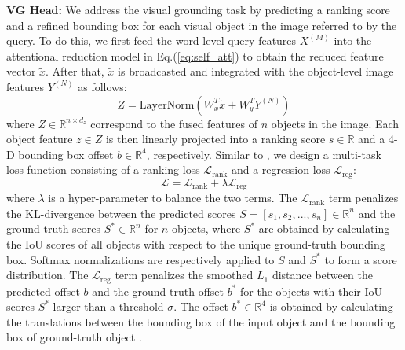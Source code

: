 \documentclass[sigconf]{acmart}
\begin{document}
\noindent\textbf{VG Head:} We address the visual grounding task by predicting a ranking score and a refined bounding box for each visual object in the image referred to by the query. To do this, we first feed the word-level query features $X^{(M)}$ into the attentional reduction model in Eq.(\ref{eq:self_att}) to obtain the reduced feature vector $\tilde{x}$. After that, $\tilde{x}$ is broadcasted and integrated with the object-level image features $Y^{(N)}$ as follows:
\begin{equation}\label{eq:vg_fusion}
Z = \mathrm{LayerNorm}(W_x^T\tilde{x} + W_y^TY^{(N)})
\end{equation}
where $Z\in\mathbb{R}^{n \times d_z}$ correspond to the fused features of $n$ objects in the image. Each object feature $z\in Z$ is then linearly projected into a ranking score $s\in\mathbb{R}$ and a 4-D bounding box offset $b\in\mathbb{R}^4$, respectively. Similar to \cite{yu2018rethinking}, we design a multi-task loss function consisting of a ranking loss $\mathcal{L}_\mathrm{rank}$ and a regression loss $\mathcal{L}_\mathrm{reg}$:
\begin{equation}\label{eq:loss_vghead}
\mathcal{L} = \mathcal{L}_\mathrm{rank} + \lambda\mathcal{L}_\mathrm{reg}
\end{equation}
where $\lambda$ is a hyper-parameter to balance the two terms.
The $\mathcal{L}_\mathrm{rank}$ term penalizes the KL-divergence between the predicted scores $S=[s_1, s_2,...,s_n]\in\mathbb{R}^n$ and the ground-truth scores $S^*\in\mathbb{R}^n$ for $n$ objects, where $S^*$ are obtained by calculating the IoU scores of all objects with respect to the unique ground-truth bounding box. Softmax normalizations are respectively applied to $S$ and $S^*$ to form a score distribution.
The $\mathcal{L}_\mathrm{reg}$ term penalizes the smoothed $L_1$ distance \cite{girshick2015fast} between the predicted offset $b$ and the ground-truth offset $b^*$ for the objects with their IoU scores $S^*$ larger than a threshold $\sigma$. The offset $b^*\in\mathbb{R}^4$ is obtained by calculating the translations between the bounding box of the input object and the bounding box of ground-truth object \cite{girshick2015fast}.
\end{document}
